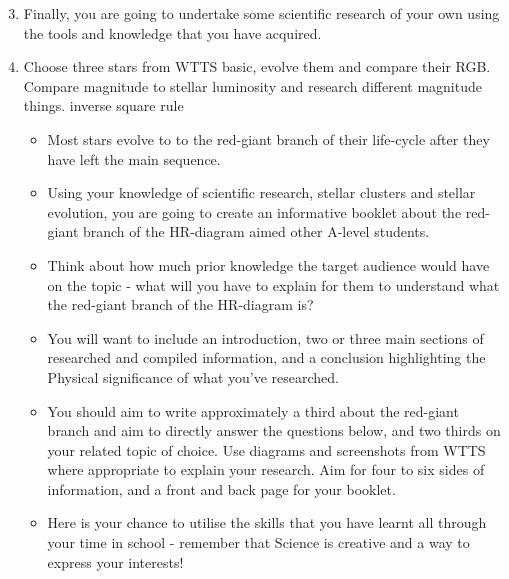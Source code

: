 \documentclass{article}
\begin{document}
    \begin{enumerate}[label=\color{black}\theenumi]
    \setcounter{enumi}{2}
        \item Finally, you are going to undertake some scientific research of your own using the tools and knowledge that you have acquired.\\
        
        
        
        \item \textcolor{dblue}{Choose three stars from WTTS basic, evolve them and compare their RGB. Compare magnitude to stellar luminosity and research different magnitude things. inverse square rule}
        
        
        
        \begin{itemize}
            \item Most stars evolve to to the red-giant branch of their life-cycle after they have left the main sequence.
            \item Using your knowledge of scientific research, stellar clusters and stellar evolution, you are going to create an informative booklet about the red-giant branch of the HR-diagram aimed other A-level students.
            \item Think about how much prior knowledge the target audience would have on the topic - what will you have to explain for them to understand what the red-giant branch of the HR-diagram is?
            \item You will want to include an introduction, two or three main sections of researched and compiled information, and a conclusion highlighting the Physical significance of what you've researched.
            \item You should aim to write approximately a third about the red-giant branch and aim to directly answer the questions below, and two thirds on your related topic of choice. Use diagrams and screenshots from WTTS where appropriate to explain your research. Aim for four to six sides of information, and a front and back page for your booklet.
            \item Here is your chance to utilise the skills that you have learnt all through your time in school - remember that Science is creative and a way to express your interests!
        \end{itemize}
    \end{enumerate}
\end{document}
